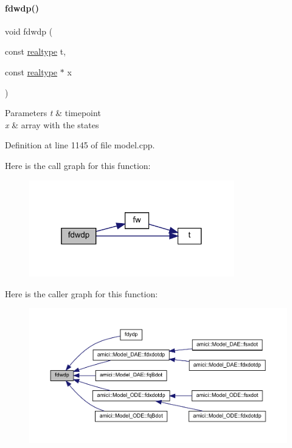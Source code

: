 \paragraph{\texorpdfstring{fdwdp()}{fdwdp()}\hspace{0.1cm}{\footnotesize\ttfamily [1/2]}}
{\footnotesize\ttfamily void fdwdp (\begin{DoxyParamCaption}\item[{const \mbox{\hyperlink{namespaceamici_a1bdce28051d6a53868f7ccbf5f2c14a3}{realtype}}}]{t,  }\item[{const \mbox{\hyperlink{namespaceamici_a1bdce28051d6a53868f7ccbf5f2c14a3}{realtype}} $\ast$}]{x }\end{DoxyParamCaption})}


\begin{DoxyParams}{Parameters}
{\em t} & timepoint \\
\hline
{\em x} & array with the states \\
\hline
\end{DoxyParams}


Definition at line 1145 of file model.\+cpp.

Here is the call graph for this function\+:
\nopagebreak
\begin{figure}[H]
\begin{center}
\leavevmode
\includegraphics[width=253pt]{classamici_1_1_model_a7a8903313cd31dad4fa580c0e434bb1c_cgraph}
\end{center}
\end{figure}
Here is the caller graph for this function\+:
\nopagebreak
\begin{figure}[H]
\begin{center}
\leavevmode
\includegraphics[width=350pt]{classamici_1_1_model_a7a8903313cd31dad4fa580c0e434bb1c_icgraph}
\end{center}
\end{figure}
\mbox{\label{classamici_1_1_model_a29b16aa0c3fb0254fb248c003473d5f9}} 
